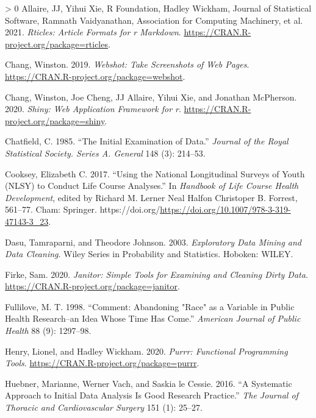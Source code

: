 \documentclass[12pt]{article}
\newlength{\cslhangindent}
\newenvironment{CSLReferences}[3] %
 {%
  \setlength{\parindent}{0pt}
  \ifodd #1 \everypar{\setlength{\hangindent}{\cslhangindent}}\ignorespaces\fi
  \ifnum #2 > 0
  \setlength{\parskip}{#2\baselineskip}
  \fi
 }%
 {}
\begin{document}
\hypertarget{refs}{}
\begin{CSLReferences}{1}{0}
\leavevmode\hypertarget{ref-rticles}{}%
Allaire, JJ, Yihui Xie, R Foundation, Hadley Wickham, Journal of Statistical Software, Ramnath Vaidyanathan, Association for Computing Machinery, et al. 2021. \emph{Rticles: Article Formats for r Markdown}. \url{https://CRAN.R-project.org/package=rticles}.

\leavevmode\hypertarget{ref-webshot}{}%
Chang, Winston. 2019. \emph{Webshot: Take Screenshots of Web Pages}. \url{https://CRAN.R-project.org/package=webshot}.

\leavevmode\hypertarget{ref-shiny}{}%
Chang, Winston, Joe Cheng, JJ Allaire, Yihui Xie, and Jonathan McPherson. 2020. \emph{Shiny: Web Application Framework for r}. \url{https://CRAN.R-project.org/package=shiny}.

\leavevmode\hypertarget{ref-Chatfield1985TIEo}{}%
Chatfield, C. 1985. {``The Initial Examination of Data.''} \emph{Journal of the Royal Statistical Society. Series A. General} 148 (3): 214--53.

\leavevmode\hypertarget{ref-eliznlsy}{}%
Cooksey, Elizabeth C. 2017. {``Using the National Longitudinal Surveys of Youth (NLSY) to Conduct Life Course Analyses.''} In \emph{Handbook of Life Course Health Development}, edited by Richard M. Lerner Neal Halfon Christoper B. Forrest, 561--77. Cham: Springer. https://doi.org/\url{https://doi.org/10.1007/978-3-319-47143-3_23}.

\leavevmode\hypertarget{ref-DasuTamraparni2003Edma}{}%
Dasu, Tamraparni, and Theodore Johnson. 2003. \emph{Exploratory Data Mining and Data Cleaning}. Wiley Series in Probability and Statistics. Hoboken: WILEY.

\leavevmode\hypertarget{ref-janitor}{}%
Firke, Sam. 2020. \emph{Janitor: Simple Tools for Examining and Cleaning Dirty Data}. \url{https://CRAN.R-project.org/package=janitor}.

\leavevmode\hypertarget{ref-racismnotrace}{}%
Fullilove, M. T. 1998. {``Comment: Abandoning "Race" as a Variable in Public Health Research--an Idea Whose Time Has Come.''} \emph{American Journal of Public Health} 88 (9): 1297--98.

\leavevmode\hypertarget{ref-purrr}{}%
Henry, Lionel, and Hadley Wickham. 2020. \emph{Purrr: Functional Programming Tools}. \url{https://CRAN.R-project.org/package=purrr}.

\leavevmode\hypertarget{ref-HuebnerMariannePhD2016Asat}{}%
Huebner, Marianne, Werner Vach, and Saskia le Cessie. 2016. {``A Systematic Approach to Initial Data Analysis Is Good Research Practice.''} \emph{The Journal of Thoracic and Cardiovascular Surgery} 151 (1): 25--27.


\end{CSLReferences}
\end{document}

